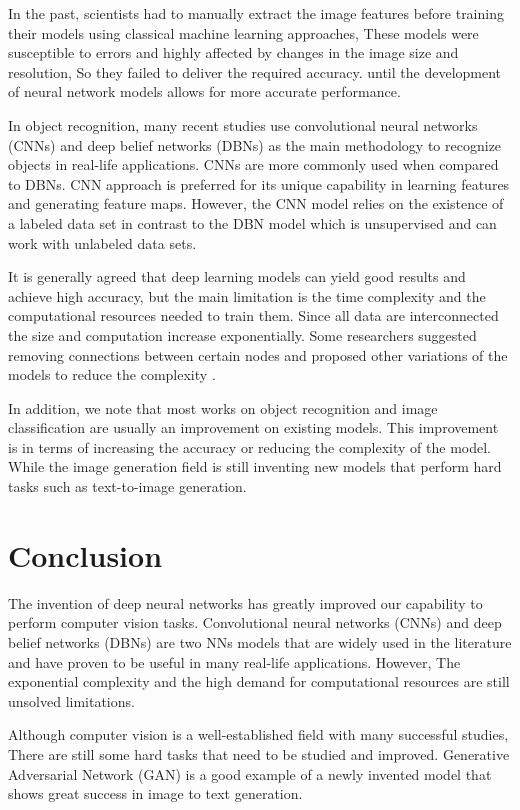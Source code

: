 \documentclass[12pt,twocolumn,a4paper]{article}
\begin{document}
    In the past, scientists had to manually extract the image features before training their models using classical machine learning approaches, These models were susceptible to errors and highly affected by changes in the image size and resolution, So they failed to deliver the required accuracy. until the development of neural network models allows for more accurate performance. 
    
    In object recognition, many recent studies use convolutional neural networks (CNNs) and deep belief networks (DBNs) as the main methodology to recognize objects in real-life applications. CNNs are more commonly used when compared to DBNs. CNN approach is preferred for its unique capability in learning features and generating feature maps. However, the CNN model relies on the existence of a labeled data set in contrast to the DBN model which is unsupervised and can work with unlabeled data sets. 

    It is generally agreed that deep learning models can yield good results and achieve high accuracy, but the main limitation is the time complexity and the computational resources needed to train them. Since all data are interconnected the size and computation increase exponentially. Some researchers suggested removing connections between certain nodes and proposed other variations of the models to reduce the complexity \cite{Horvath2020-qh}.

    In addition, we note that most works on object recognition and image classification are usually an improvement on existing models. This improvement is in terms of increasing the accuracy or reducing the complexity of the model. While the image generation field is still inventing new models that perform hard tasks such as text-to-image generation. 


    \section{Conclusion}
    \hspace{0.3cm} The invention of deep neural networks has greatly improved our capability to perform computer vision tasks. Convolutional neural networks (CNNs) and deep belief networks (DBNs) are two NNs models that are widely used in the literature and have proven to be useful in many real-life applications. However, The exponential complexity and the high demand for computational resources are still unsolved limitations.
    
    Although computer vision is a well-established field with many successful studies, There are still some hard tasks that need to be studied and improved. Generative Adversarial Network (GAN) is a good example of a newly invented model that shows great success in image to text generation.
    
    
    
\end{document}
